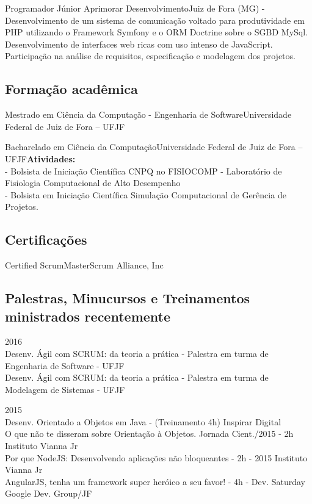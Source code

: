\documentclass[12pt, a4paper, sans]{moderncv}
\begin{document}
{Programador Júnior}
{Aprimorar Desenvolvimento}{Juiz de Fora (MG)}{}
{- Desenvolvimento de um sistema de comunicação voltado para produtividade em PHP utilizando o Framework Symfony e o ORM Doctrine sobre o SGBD MySql. Desenvolvimento de interfaces web ricas com uso intenso de JavaScript. Participação na análise de requisitos, especificação e modelagem dos projetos.\newline{}
\newline{}
\newline{}
\newline{}
\newline{}}


%
%
\subsection{Formação acadêmica}
{Mestrado em Ciência da Computação - Engenharia de Software}{Universidade Federal de Juiz de Fora -- UFJF}{}{}{}

{Bacharelado em Ciência da Computação}{Universidade Federal de Juiz de Fora -- UFJF}{}{}{\textbf{Atividades:} 
\\
- Bolsista de Iniciação Científica CNPQ no FISIOCOMP - Laboratório de Fisiologia Computacional de Alto Desempenho
\\
- Bolsista em Iniciação Científica Simulação Computacional de
Gerência de Projetos.}

\subsection{Certificações}

{Certified ScrumMaster}{Scrum Alliance, Inc}{}{}{}


\subsection{Palestras, Minucursos e Treinamentos ministrados recentemente}
\cventry{}
{}{2016}{
\\Desenv. Ágil com SCRUM: da teoria a prática - Palestra em turma de Engenharia de Software - UFJF
\\Desenv. Ágil com SCRUM: da teoria a prática - Palestra em turma de Modelagem de Sistemas - UFJF
}{}{}

\cventry{}
{}{2015}{
\\Desenv. Orientado a Objetos em Java - (Treinamento 4h) Inspirar Digital
\\O que não te disseram sobre Orientação à Objetos. Jornada Cient./2015 - 2h Instituto Vianna Jr
\\Por que NodeJS: Desenvolvendo aplicações não bloqueantes - 2h - 2015 Instituto Vianna Jr
\\AngularJS, tenha um framework super heróico a seu favor! - 4h - Dev. Saturday Google Dev. Group/JF}{}{}
\end{document}
